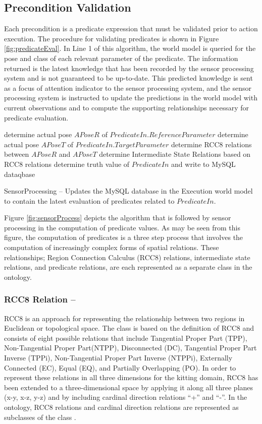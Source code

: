 \subsection{Precondition Validation}
\label{sect:preconditionValid}
Each precondition is a predicate expression that must be validated prior to
action execution.
The procedure for validating predicates is shown in Figure \ref{fig:predicateEval}. In Line 1 of this algorithm, the world
model is queried for the pose and class of each relevant 
parameter of the predicate. The information returned is the 
latest knowledge that has been recorded by the sensor processing
system and is not guaranteed to be up-to-date. This predicted
knowledge is sent as a focus of attention indicator to the sensor
processing system, and the sensor processing system is instructed to
update the predictions in the world model with current observations
and to compute the supporting relationships necessary for predicate
evaluation.
%
\begin{algorithm}[h!]
 	determine actual pose $APoseR$ of $PredicateIn.ReferenceParameter$\;
 	determine actual pose $APoseT$ of $PredicateIn.TargetParameter$\;
 	determine RCC8 relations between $APoseR$ and $APoseT$\;
 	determine Intermediate State Relations based on RCC8 relations\;
 	determine truth value of $PredicateIn$ and write to MySQL dataqbase\;
\caption{{\sc SensorProcessing} -- Updates the MySQL database in the Execution world model
to contain the latest evaluation of predicates related to $PredicateIn$.}
\label{fig:sensorProcess}
\end{algorithm}
%
Figure \ref{fig:sensorProcess} depicts the algorithm that is followed by
sensor processing in the computation of predicate values. As may be seen from this
figure, the computation of predicates is a three step process that involves
the computation of increasingly complex forms of spatial relations. These
relationships; Region Connection Calculus (RCC8) relations, intermediate state relations, and predicate relations, are each represented as a separate class in
the ontology.
%
\subsubsection{RCC8 Relation --}
RCC8 \cite{Wolter2000} is an approach for representing the relationship between two regions in Euclidean or topological space. The class  
is based on the definition of RCC8 and consists of eight possible relations that include Tangential Proper Part (TPP), Non-Tangential Proper Part(NTPP), Disconnected (DC), Tangential Proper Part Inverse (TPPi), Non-Tangential Proper Part Inverse (NTPPi), Externally Connected (EC), Equal (EQ), and Partially Overlapping (PO). In order to represent these relations in all three dimensions for the kitting domain, RCC8 has been extended to a three-dimensional space by applying it along all three planes (x-y, x-z, y-z) and by including cardinal direction relations ``+'' and ``-''. In the ontology, RCC8 relations and cardinal direction relations are represented as subclasses of the class . 
%
